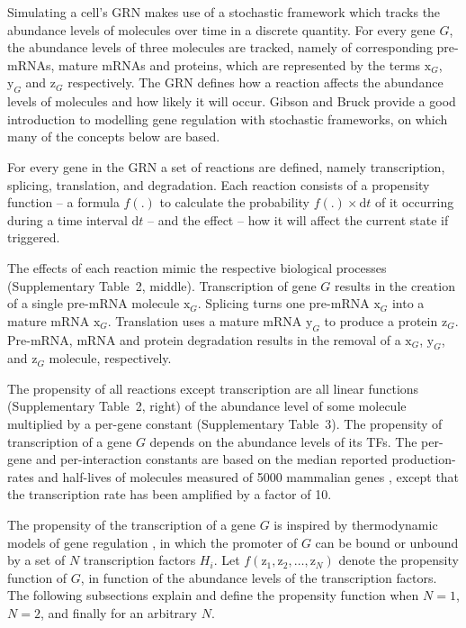 \documentclass[
  table,
  10pt,
  a4paper]{article}
\begin{document}
Simulating a cell's GRN makes use of a stochastic framework which tracks
the abundance levels of molecules over time in a discrete quantity. For
every gene \(G\), the abundance levels of three molecules are tracked,
namely of corresponding pre-mRNAs, mature mRNAs and proteins, which are
represented by the terms \(\text{x}_{G}\), \(\text{y}_{G}\) and
\(\text{z}_{G}\) respectively. The GRN defines how a reaction affects
the abundance levels of molecules and how likely it will occur. Gibson
and Bruck \autocite{gibson_probabilisticmodelprokaryotic_2000} provide a
good introduction to modelling gene regulation with stochastic
frameworks, on which many of the concepts below are based.

For every gene in the GRN a set of reactions are defined, namely
transcription, splicing, translation, and degradation. Each reaction
consists of a propensity function -- a formula \(f(.)\) to calculate the
probability \(f(.) \times \text{d}t\) of it occurring during a time
interval \(\text{d}t\) -- and the effect -- how it will affect the
current state if triggered.

The effects of each reaction mimic the respective biological processes
(Supplementary Table~2, middle). Transcription of gene \(G\) results in
the creation of a single pre-mRNA molecule \(\text{x}_{G}\). Splicing
turns one pre-mRNA \(\text{x}_{G}\) into a mature mRNA \(\text{x}_{G}\).
Translation uses a mature mRNA \(\text{y}_{G}\) to produce a protein
\(\text{z}_{G}\). Pre-mRNA, mRNA and protein degradation results in the
removal of a \(\text{x}_{G}\), \(\text{y}_{G}\), and \(\text{z}_{G}\)
molecule, respectively.

The propensity of all reactions except transcription are all linear
functions (Supplementary Table~2, right) of the abundance level of some
molecule multiplied by a per-gene constant (Supplementary Table~3). The
propensity of transcription of a gene \(G\) depends on the abundance
levels of its TFs. The per-gene and per-interaction constants are based
on the median reported production-rates and half-lives of molecules
measured of 5000 mammalian genes
\autocite{schwanhausser_globalquantificationmammalian_2011}, except that
the transcription rate has been amplified by a factor of 10.

\newcommand{\proptran}{f}
\newcommand{\ai}[2]{$S_{#1} = S_{#2b}$}
\newcommand{\zk}[1]{\frac{y_#1}{k_#1}^{c_#1}}
\newcommand{\wi}[1]{\nu_#1}

The propensity of the transcription of a gene \(G\) is inspired by
thermodynamic models of gene regulation
\autocite{schilstra_biologicgeneexpression_2008}, in which the promoter
of \(G\) can be bound or unbound by a set of \(N\) transcription factors
\(H_i\). Let \(f(\text{z}_{1}, \text{z}_{2}, \ldots, \text{z}_{N})\)
denote the propensity function of \(G\), in function of the abundance
levels of the transcription factors. The following subsections explain
and define the propensity function when \(N=1\), \(N=2\), and finally
for an arbitrary \(N\).
\end{document}
